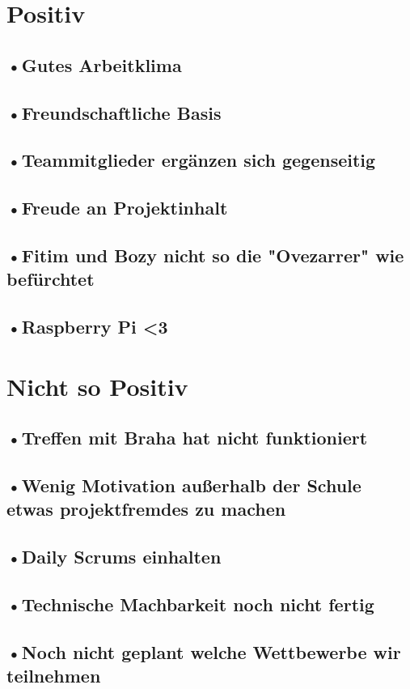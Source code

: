 

\section{Positiv}
\subsection{•Gutes Arbeitklima}
\subsection{•Freundschaftliche Basis}
\subsection{•Teammitglieder ergänzen sich gegenseitig}
\subsection{•Freude an Projektinhalt}
\subsection{•Fitim und Bozy nicht so die "Ovezarrer" wie befürchtet}
\subsection{•Raspberry Pi <3}

\section{Nicht so Positiv}
\subsection{•Treffen mit Braha hat nicht funktioniert }
\subsection{•Wenig Motivation außerhalb der Schule etwas projektfremdes zu machen}
\subsection{•Daily Scrums einhalten}
\subsection{•Technische Machbarkeit noch nicht fertig}
\subsection{•Noch nicht geplant welche Wettbewerbe wir teilnehmen}
